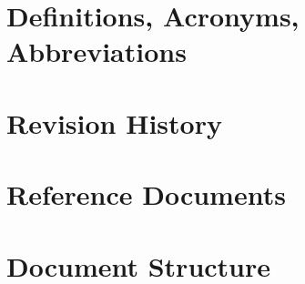 \section{Definitions, Acronyms, Abbreviations}
\label{sec:definitions}

\section{Revision History}
\label{sec:revision}

\section{Reference Documents}
\label{sec:reference}

\section{Document Structure}
\label{sec:structure}
